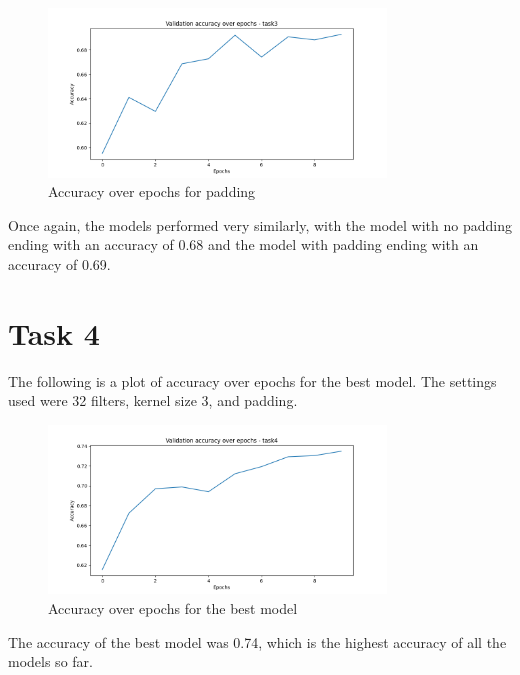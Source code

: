 \documentclass{article}
\begin{document}
\begin{figure}[H]
  \centering
  \includegraphics[width=0.8\textwidth]{accuracy_task3_padding_1.png}
  \caption{Accuracy over epochs for padding}
\end{figure}

Once again, the models performed very similarly, with the model with no padding ending with an accuracy of 0.68 and the model with padding ending with an accuracy of 0.69.

\newpage

\section{Task 4}

The following is a plot of accuracy over epochs for the best model.
The settings used were 32 filters, kernel size 3, and padding.

\begin{figure}[H]
  \centering
  \includegraphics[width=0.8\textwidth]{accuracy_task4_num_filters_32_kernel_size_3_padding_1_dropout_rate_0.3.png}
  \caption{Accuracy over epochs for the best model}
\end{figure}

The accuracy of the best model was 0.74, which is the highest accuracy of all the models so far.
\end{document}

